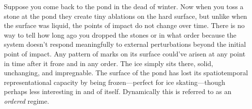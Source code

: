 Suppose you come back to the pond in the dead of winter. Now when you toss a stone at the pond they create tiny ablations on the hard surface, but unlike when the surface was liquid, the points of impact do not change over time. There is no way to tell how long ago you dropped the stones or in what order because the system doesn't respond meaningfully to external perturbations beyond the initial point of impact. Any pattern of marks on its surface could've arisen at any point in time after it froze and in any order. The ice simply sits there, solid, unchanging, and impregnable. The surface of the pond has lost its spatiotemporal representational capacity by being frozen---perfect for ice skating---though perhaps less interesting in and of itself. Dynamically this is referred to as an \emph{ordered} regime.



